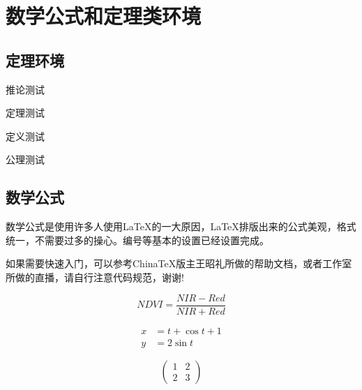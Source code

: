 
\chapter{数学公式和定理类环境}

\section{定理环境}

\begin{corollary}\label{cor1}
推论测试
\end{corollary}


\begin{theorem}\label{thm1}
定理测试
\end{theorem}

\begin{definition}\label{def1}
定义测试
\end{definition}

\begin{axiom}\label{axi1}
公理测试
\end{axiom}



\section{数学公式}

\par 数学公式是使用许多人使用\LaTeX 的一大原因，\LaTeX 排版出来的公式美观，格式统一，不需要过多的操心。编号等基本的设置已经设置完成。

\par 如果需要快速入门，可以参考ChinaTeX版主王昭礼所做的帮助文档，或者工作室所做的直播，请自行注意代码规范，谢谢!


\begin{equation}
	NDVI  =  \frac{NIR-Red}{NIR+Red}	
\end{equation}


\begin{align} 
	 x   &   =  t  + \cos t + 1 \\
	 y   &  = 2 \sin t
\end{align}


\[ \begin{pmatrix}
        1    &         2\\ 
        2    &         3  
\end{pmatrix}			\label{matrix}  
\]






